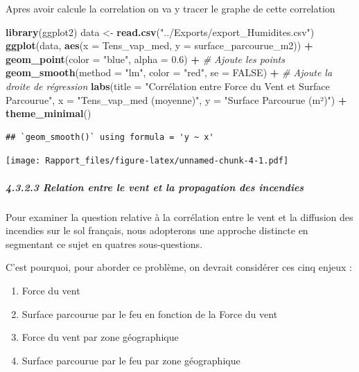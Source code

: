 \documentclass[
]{article}
\newenvironment{Shaded}{\begin{snugshade}}{\end{snugshade}}
\newcommand{\AttributeTok}[1]{\textcolor[rgb]{0.13,0.29,0.53}{#1}}
\newcommand{\CommentTok}[1]{\textcolor[rgb]{0.56,0.35,0.01}{\textit{#1}}}
\newcommand{\ConstantTok}[1]{\textcolor[rgb]{0.56,0.35,0.01}{#1}}
\newcommand{\FloatTok}[1]{\textcolor[rgb]{0.00,0.00,0.81}{#1}}
\newcommand{\FunctionTok}[1]{\textcolor[rgb]{0.13,0.29,0.53}{\textbf{#1}}}
\newcommand{\NormalTok}[1]{#1}
\newcommand{\OtherTok}[1]{\textcolor[rgb]{0.56,0.35,0.01}{#1}}
\newcommand{\SpecialCharTok}[1]{\textcolor[rgb]{0.81,0.36,0.00}{\textbf{#1}}}
\newcommand{\StringTok}[1]{\textcolor[rgb]{0.31,0.60,0.02}{#1}}
\providecommand{\tightlist}{%
  \setlength{\itemsep}{0pt}\setlength{\parskip}{0pt}}
\begin{document}
Apres avoir calcule la correlation on va y tracer le graphe de cette
correlation

\begin{Shaded}
\begin{Highlighting}[]
\FunctionTok{library}\NormalTok{(ggplot2)}
\NormalTok{data }\OtherTok{\textless{}{-}} \FunctionTok{read.csv}\NormalTok{(}\StringTok{"../Exports/export\_Humidites.csv"}\NormalTok{)}
\FunctionTok{ggplot}\NormalTok{(data, }\FunctionTok{aes}\NormalTok{(}\AttributeTok{x =}\NormalTok{ Tens\_vap\_med, }\AttributeTok{y =}\NormalTok{ surface\_parcourue\_m2)) }\SpecialCharTok{+}
  \FunctionTok{geom\_point}\NormalTok{(}\AttributeTok{color =} \StringTok{"blue"}\NormalTok{, }\AttributeTok{alpha =} \FloatTok{0.6}\NormalTok{) }\SpecialCharTok{+}  \CommentTok{\# Ajoute les points}
  \FunctionTok{geom\_smooth}\NormalTok{(}\AttributeTok{method =} \StringTok{"lm"}\NormalTok{, }\AttributeTok{color =} \StringTok{"red"}\NormalTok{, }\AttributeTok{se =} \ConstantTok{FALSE}\NormalTok{) }\SpecialCharTok{+}  \CommentTok{\# Ajoute la droite de régression}
  \FunctionTok{labs}\NormalTok{(}\AttributeTok{title =} \StringTok{"Corrélation entre Force du Vent et Surface Parcourue"}\NormalTok{,}
       \AttributeTok{x =} \StringTok{"Tens\_vap\_med (moyenne)"}\NormalTok{,}
       \AttributeTok{y =} \StringTok{"Surface Parcourue (m²)"}\NormalTok{) }\SpecialCharTok{+}
  \FunctionTok{theme\_minimal}\NormalTok{()}
\end{Highlighting}
\end{Shaded}

\begin{verbatim}
## `geom_smooth()` using formula = 'y ~ x'
\end{verbatim}

\texttt{[image: Rapport\_files/figure-latex/unnamed-chunk-4-1.pdf]}

\subparagraph{4.3.2.3 Relation entre le vent et la propagation des
incendies}\label{relation-entre-le-vent-et-la-propagation-des-incendies}

Pour examiner la question relative à la corrélation entre le vent et la
diffusion des incendies sur le sol français, nous adopterons une
approche distincte en segmentant ce sujet en quatres sous-questions.

C'est pourquoi, pour aborder ce problème, on devrait considérer ces cinq
enjeux :

\begin{enumerate}
\def\labelenumi{\arabic{enumi}.}
\tightlist
\item
  Force du vent
\item
  Surface parcourue par le feu en fonction de la Force du vent
\item
  Force du vent par zone géographique
\item
  Surface parcourue par le feu par zone géographique
\end{enumerate}
\end{document}
